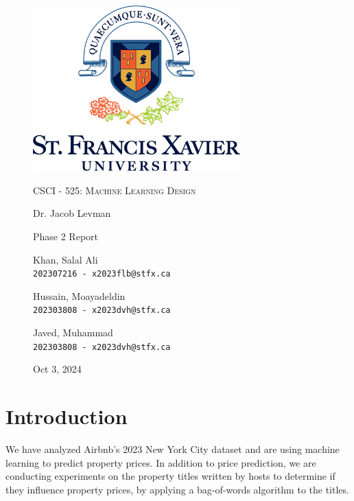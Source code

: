 \documentclass[a4paper,12pt]{article}
\begin{document}
\begin{titlepage}

\begin{figure}[H]
  \centering
  \includegraphics[width=8cm]{../stfx_logo.png}\par
  \vspace{1cm}
  {\scshape\Large CSCI - 525: Machine Learning Design \par}
  \vspace{0.5cm}
  {\large Dr. Jacob Levman \par}
  \vspace{1cm}
  {\Large Phase 2 Report \par}
  \vspace{1cm}
  {\large Khan, Salal Ali\\ \texttt{202307216 - x2023flb@stfx.ca} \par}
  \vspace{0.5cm}
  {\large Hussain, Moayadeldin\\ \texttt{202303808 - x2023dvh@stfx.ca} \par}
  \vspace{0.5cm}
  {\large Javed, Muhammad\\ \texttt{202303808 - x2023dvh@stfx.ca} \par}
  \vfill
  \vspace{0.5cm}
  {\large Oct 3, 2024 \par}
\end{figure}

\end{titlepage}

\section*{Introduction}

We have analyzed Airbnb's 2023 New York City dataset and are using machine learning to predict property prices. In addition to price prediction, we are conducting experiments on the property titles written by hosts to determine if they influence property prices, by applying a bag-of-words algorithm to the titles.
\end{document}
